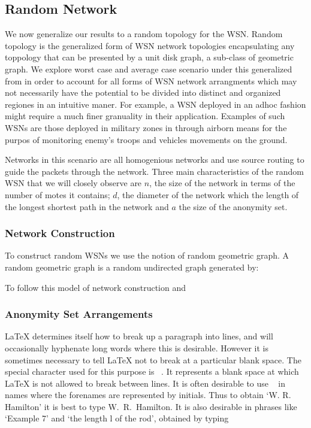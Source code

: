 \documentclass[12pt]{report}
\begin{document}
\subsection{Random Network}\label{randtopoconst}

We now generalize our results to a random topology for the WSN. Random topology is the generalized form of WSN network topologies encapsulating  any toppology that can be presented by a unit disk graph, a sub-class of geometric graph. We explore worst case and average case scenario under this generalized from in order to account for all forms of WSN network arrangments which may not necessarily have the potential to be divided into distinct and organized regiones in an intuitive maner. For example, a WSN deployed in an adhoc fashion might require a much finer granuality in their application. Examples of such WSNs are those deployed in military zones in through airborn means for the purpos of monitoring  enemy's troops and vehicles movements on the ground. 


Networks in this scenario are all homogenious networks and use source routing to guide the packets through the network. Three main characteristics of the random WSN that we will closely observe are $n$, the size of the network in terms of the number of motes it contains; $d$, the diameter of the network which the length of the longest shortest path in the network and $a$ the size of the anonymity set.



\subsubsection{Network Construction}

To construct random WSNs  we use the notion of random geometric graph. A random geometric graph is a random undirected graph generated by:


To follow this model of network construction and  


\subsubsection{Anonymity Set Arrangements}

LaTeX determines itself how to break up a paragraph into lines, and will occasionally hyphenate long words where this is desirable. However it is sometimes necessary to tell LaTeX not to break at a particular blank space. The special character used for this purpose is ~. It represents a blank space at which LaTeX is not allowed to break between lines. It is often desirable to use ~ in names where the forenames are represented by initials. Thus to obtain `W. R. Hamilton' it is best to type W.~R.~Hamilton. It is also desirable in phrases like `Example 7' and `the length l of the rod', obtained by typing
\end{document}
